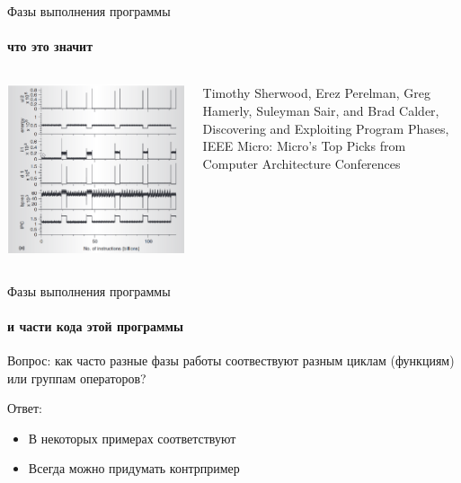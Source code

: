 \documentclass{beamer}              %
\begin{document}
\begin{frame}{Фазы выполнения программы}
  \framesubtitle{что это значит}
   
  \begin{columns}
        \includegraphics[height=.8\textheight]{img/Phases.png}

      \small
      Timothy Sherwood, Erez Perelman, Greg Hamerly, Suleyman Sair, and Brad Calder, Discovering and Exploiting Program Phases, IEEE Micro: Micro's Top Picks from Computer Architecture Conferences
      
  \end{columns}		  
\end{frame}

\begin{frame}{Фазы выполнения программы}
  \framesubtitle{и части кода этой программы}
  Вопрос: как часто разные фазы работы соотвествуют разным циклам (функциям) или группам операторов?
  
  Ответ: 
  \begin{itemize}
      \item В некоторых примерах соответствуют
      \item Всегда можно придумать контрпример
  \end{itemize}
  
\end{frame}
\end{document}

